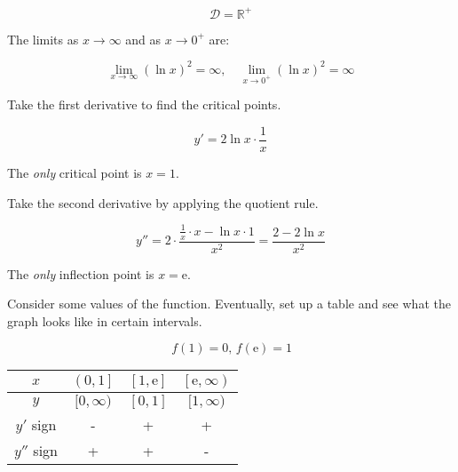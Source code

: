 \documentclass{article}
\begin{document}
\begin{equation*}\mathcal{D} = \mathbb{R}^+\end{equation*}

\hfill

\noindent The limits as $x\to\infty$ and as $x\to0^+$ are:

\begin{equation*}\lim_{x\to \infty}(\ln x)^2=\infty,\quad \lim_{x\to0^+}(\ln x)^2=\infty \end{equation*}

\hfill

\noindent Take the first derivative to find the critical points.

\begin{equation*}y'=2\ln x\cdot\frac1x\end{equation*}

\hfill

\noindent The \textit{only} critical point is $x=1$.

\hfill

\noindent Take the second derivative by applying the quotient rule.

\begin{equation*}y''=2\cdot\frac{\frac1x \cdot x-\ln x \cdot 1}{x^2}=\frac{2-2\ln x}{x^2}\end{equation*}

\hfill

\noindent The \textit{only} inflection point is $x=\mathrm{e}$.

\hfill

\noindent Consider some values of the function. Eventually, set up a table and see what the graph looks like in certain intervals.

\begin{equation*}\,f\left(1\right)=0,\,f(\mathrm{e})=1\end{equation*}

\begin{center}
    \large
    \begin{tabular}{ |c| c c c| } 
    \hline
        $x$ & $\left(0, 1\right]$ & $\left[1, \mathrm{e}\right]$&$\left[\mathrm{e}, \infty\right)$  \\
        \hline
        $y$ & $[0, \infty)$ &$[0,1]$ & $[1, \infty)$ \\
        \hline
        $y'$ sign & - & + & + \\
        \hline
        $y''$ sign & + & + & - \\
        \hline
    \end{tabular}
\end{center}
\end{document}
